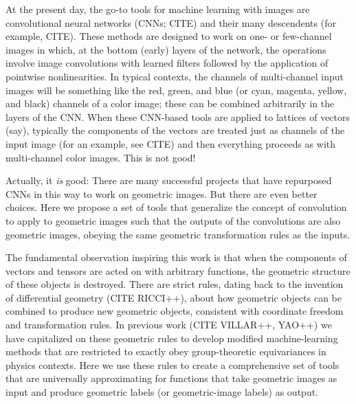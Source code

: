 \documentclass{article}
\theoremstyle{plain}
\begin{document}

At the present day, the go-to tools for machine learning with images are convolutional neural networks (CNNs; CITE) and their many descendents (for example, CITE).
These methods are designed to work on one- or few-channel images in which, at the bottom (early) layers of the network, the operations involve image convolutions with learned filters followed by the application of pointwise nonlinearities.
In typical contexts, the channels of multi-channel input images will be something like the red, green, and blue (or cyan, magenta, yellow, and black) channels of a color image; these can be combined arbitrarily in the layers of the CNN.
When these CNN-based tools are applied to lattices of vectors (say), typically the components of the vectors are treated just as channels of the input image (for an example, see CITE) and then everything proceeds as with multi-channel color images.
This is not good!

Actually, it \emph{is} good: There are many successful projects that have repurposed CNNs in this way to work on geometric images.
But there are even better choices.
Here we propose a set of tools that generalize the concept of convolution to apply to geometric images such that the outputs of the convolutions are also geometric images, obeying the same geometric transformation rules as the inputs.

The fundamental observation inspiring this work is that when the components of vectors and tensors are acted on with arbitrary functions, the geometric structure of these objects is destroyed.
There are strict rules, dating back to the invention of differential geometry (CITE RICCI++), about how geometric objects can be combined to produce new geometric objects, consistent with coordinate freedom and transformation rules.
In previous work (CITE VILLAR++, YAO++) we have capitalized on these geometric rules to develop modified machine-learning methods that are restricted to exactly obey group-theoretic equivariances in physics contexts.
Here we use these rules to create a comprehensive set of tools that are universally approximating for functions that take geometric images as input and produce geometric labels (or geometric-image labels) as output.
\end{document}
